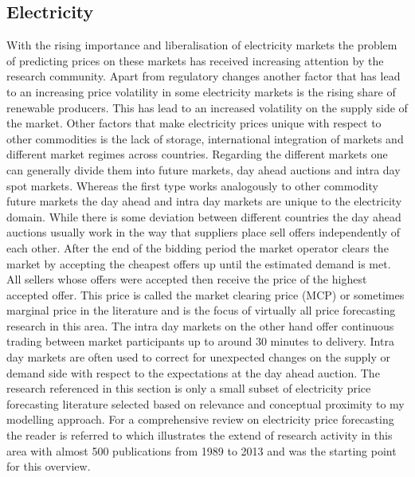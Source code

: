 \subsection{Electricity}
With the rising importance and liberalisation of electricity markets the problem of predicting prices on these markets has received increasing attention by the research community. Apart from regulatory changes another factor that has lead to an increasing price volatility in some electricity markets is the rising share of renewable producers. This has lead to an increased volatility on the supply side of the market. Other factors that make electricity prices unique with respect to other commodities is the lack of storage, international integration of markets and different market regimes across countries. Regarding the different markets one can generally divide them into future markets, day ahead auctions and intra day spot markets. Whereas the first type works analogously to other commodity future markets the day ahead and intra day markets are unique to the electricity domain. While there is some deviation between different countries the day ahead auctions usually work in the way that suppliers place sell offers independently of each other. After the end of the bidding period the market operator clears the market by accepting the cheapest offers up until the estimated demand is met. All sellers whose offers were accepted then receive the price of the highest accepted offer. This price is called the market clearing price (MCP) or sometimes marginal price in the literature and is the focus of virtually all price forecasting research in this area. The intra day markets on the other hand offer continuous trading between market participants up to around 30 minutes to delivery. Intra day markets are often used to correct for unexpected changes on the supply or demand side with respect to the expectations at the day ahead auction. The research referenced in this section is only a small subset of electricity price forecasting literature selected based on relevance and conceptual proximity to my modelling approach.
For a comprehensive review on electricity price forecasting the reader is referred to \textit{\cite{weron_electricity_2014}} which illustrates the extend of research activity in this area with almost 500 publications from 1989 to 2013 and was the starting point for this overview.
